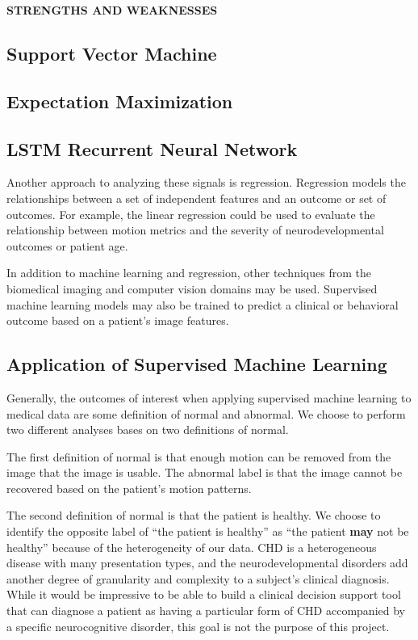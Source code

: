 \textbf{STRENGTHS AND WEAKNESSES} 

\subsection{Support Vector Machine}

\subsection{Expectation Maximization}

\subsection{LSTM Recurrent Neural Network}

Another approach to analyzing these signals is regression. Regression models the relationships between a set of independent features and an outcome or set of outcomes. For example, the linear regression could be used to evaluate the relationship between motion metrics and the severity of neurodevelopmental outcomes or patient age. 

In addition to machine learning and regression, other techniques from the biomedical imaging and computer vision domains may be used. Supervised machine learning models may also be trained to predict a clinical or behavioral outcome based on a patient's image features.

\subsection{Application of Supervised Machine Learning}

Generally, the outcomes of interest when applying supervised machine learning to medical data are some definition of normal and abnormal. We choose to perform two different analyses bases on two definitions of normal. 

The first definition of normal is that enough motion can be removed from the image that the image is usable. The abnormal label is that the image cannot be recovered based on the patient's motion patterns.

The second definition of normal is that the patient is healthy. We choose to identify the opposite label of ``the patient is healthy'' as ``the patient \textbf{may} not be healthy'' because of the heterogeneity of our data. CHD is a heterogeneous disease with many presentation types, and the neurodevelopmental disorders add another degree of granularity and complexity to a subject's clinical diagnosis. While it would be impressive to be able to build a clinical decision support tool that can diagnose a patient as having a particular form of CHD accompanied by a specific neurocognitive disorder, this goal is not the purpose of this project.

